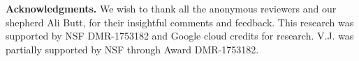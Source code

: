 

\noindent \textbf{Acknowledgments.} We wish to thank all the anonymous reviewers and our shepherd Ali Butt, for  their insightful comments and feedback.
This research was supported by NSF DMR-1753182 and Google cloud credits for research. 
V.J. was partially supported by NSF through Award DMR-1753182.





